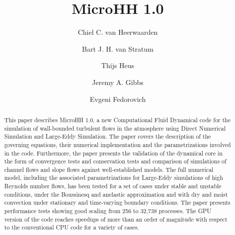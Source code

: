\documentclass[gmd]{copernicus}
\begin{document}
\linenumbers

\title{MicroHH 1.0}


\author[1]{Chiel C. van Heerwaarden}
\author[1]{Bart J. H. van Stratum}
\author[2]{Thijs Heus}
\author[3]{Jeremy A. Gibbs}
\author[3]{Evgeni Fedorovich}










\received{}
\pubdiscuss{} %
\revised{}
\accepted{}
\published{}




\maketitle  %

\begin{abstract}
This paper describes MicroHH 1.0, a new Computational Fluid Dynamical code for the simulation of wall-bounded turbulent flows in the atmosphere using Direct Numerical Simulation and Large-Eddy Simulation. The paper covers the description of the governing equations, their numerical implementation and the parametrizations involved in the code. Furthermore, the paper presents the validation of the dynamical core in the form of convergence tests and conservation tests and comparison of simulations of channel flows and slope flows against well-established models. The full numerical model, including the associated parametrizations for Large-Eddy simulations of high Reynolds number flows, has been tested for a set of cases under stable and unstable conditions, under the Boussinesq and anelastic approximation and with dry and moist convection under stationary and time-varying boundary conditions. The paper presents performance tests showing good scaling from 256 to 32,738 processes. The GPU version of the code reaches speedups of more than an order of magnitude with respect to the conventional CPU code for a variety of cases.
\end{abstract}
\end{document}
